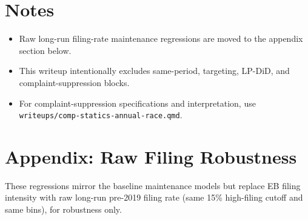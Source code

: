 \documentclass[
  11pt,
]{article}
\providecommand{\tightlist}{%
  \setlength{\itemsep}{0pt}\setlength{\parskip}{0pt}}
\begin{document}
\newpage

\section{Notes}\label{notes}

\begin{itemize}
\tightlist
\item
  Raw long-run filing-rate maintenance regressions are moved to the
  appendix section below.
\item
  This writeup intentionally excludes same-period, targeting, LP-DiD,
  and complaint-suppression blocks.
\item
  For complaint-suppression specifications and interpretation, use
  \texttt{writeups/comp-statics-annual-race.qmd}.
\end{itemize}

\newpage

\section{Appendix: Raw Filing
Robustness}\label{appendix-raw-filing-robustness}

These regressions mirror the baseline maintenance models but replace EB
filing intensity with raw long-run pre-2019 filing rate (same 15\%
high-filing cutoff and same bins), for robustness only.
\end{document}
